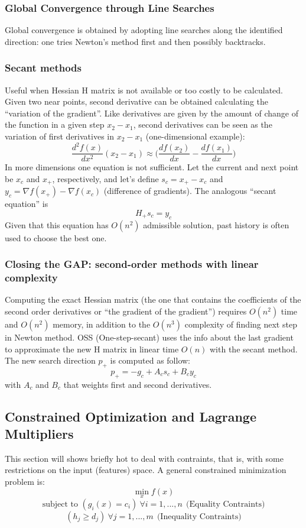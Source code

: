 \documentclass[10pt]{article}
\begin{document}
\subsubsection{Global Convergence through Line Searches}
Global convergence is obtained by adopting line searches along the identified direction: one tries Newton's method first and then possibly backtracks.

\subsubsection{Secant methods}
Useful when Hessian H matrix is not available or too costly to be calculated. Given two near points, second derivative can be obtained calculating the ``variation of the gradient''. Like derivatives are given by the amount of change of the function in a given step $x_{2} - x_{1}$, second derivatives can be seen as the variation of first derivatives in $x_{2} - x_{1}$ (one-dimensional example):
$$ \frac{d^2 f(x)}{d x^2} (x_{2} - x_{1}) \approx \bigg( \frac{df(x_{2})}{dx} - \frac{df(x_{1})}{dx} \bigg) $$
In more dimensions one equation is not sufficient. Let the current and next point be $x_{c}$ and $x_{+}$, respectively, and let's define $s_{c} = x_{+} - x_{c}$ and $y_{c} = \nabla f(x_{+}) - \nabla f(x_{c})$ (difference of gradients). The analogous ``secant equation'' is
$$
H_{+} s_{c} = y_{c}
$$
Given that this equation has $O(n^2)$ admissible solution, past history is often used to choose the best one.

\subsubsection{Closing the GAP: second-order methods with linear complexity}
Computing the exact Hessian matrix (the one that contains the coefficients of the second order derivatives or ``the gradient of the gradient'') requires $O(n^2)$ time and $O(n^2)$ memory, in addition to the $O(n^3)$ complexity of finding next step in Newton method. OSS (One-step-secant) uses the info about the last gradient to approximate the new H matrix in linear time $O(n)$ with the secant method.
The new search direction $p_{+}$ is computed as follow:
$$
p_{+} = -g_{c} + A_{c} s_{c} + B_{c} y_{c}
$$
with $A_{c}$ and $B_{c}$ that weights first and second derivatives.

\subsection{Constrained Optimization and Lagrange Multipliers}
This section will shows briefly hot to deal with contraints, that is, with some restrictions on the input (features) space. A general constrained minimization problem is: 
$$
\min_{x}		f(x)$$
$$\text{subject to }		(g_{i} (x) = c_{i}) \ \forall i = 1,...,n \ \ \text{(Equality Contraints)}$$
$$			(h_{j} \geq d_{j}) \ \forall j = 1,...,m \ \ \text{(Inequality Contraints)}$$
\end{document}
